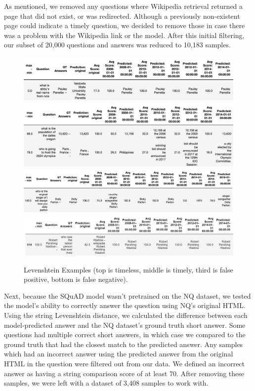 \documentclass{article}
\begin{document}
As mentioned, we removed any questions where Wikipedia retrieval returned a page
that did not exist, or was redirected. Although a previously non-existent page
could indicate a timely question, we decided to remove those in case there was
a problem with the Wikipedia link or the model. After this initial filtering,
our subset of 20,000 questions and answers was reduced to 10,183 samples.
\begin{figure}[ht]
    \begin{center}
        \includegraphics[width=5in]{timeless leven.png}
        \includegraphics[width=5in]{timely leven.png}
        \includegraphics[width=5in]{leven false pos.png}
        \includegraphics[width=5in]{leven_false_neg.PNG}
	\end{center}
  \caption{Levenshtein Examples (top is timeless, middle is timely, third is false positive, bottom is false negative).}
  \label{fig:levenshtein_examples}
\end{figure}

Next, because the SQuAD model wasn't pretrained on the NQ dataset, we tested the
model's ability to correctly answer the question using NQ's original HTML. Using
the string Levenshtein distance, we calculated the difference between each
model-predicted answer and the NQ dataset's ground truth short answer. Some
questions had multiple correct short answers, in which case we compared to the
ground truth that had the closest match to the predicted answer. Any samples
which had an incorrect answer using the predicted answer from the original HTML
in the question were filtered out from our data. We defined an incorrect answer
as having a string comparison score of at least 70. After removing these
samples, we were left with a dataset of 3,408 samples to work with.
\end{document}
